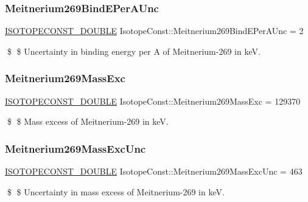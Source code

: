 \subsubsection{\texorpdfstring{Meitnerium269\+Bind\+E\+Per\+A\+Unc}{Meitnerium269BindEPerAUnc}}
{\footnotesize\ttfamily \mbox{\hyperlink{group___isotope_const-_macros_ga8f45a7272ce02c0b4c65c44636ed719a}{I\+S\+O\+T\+O\+P\+E\+C\+O\+N\+S\+T\+\_\+\+D\+O\+U\+B\+LE}} Isotope\+Const\+::\+Meitnerium269\+Bind\+E\+Per\+A\+Unc = 2}

\$ \$ Uncertainty in binding energy per A of Meitnerium-\/269 in keV. \mbox{\label{group___isotope_const-_meitnerium-_mt269_ga18ef91ebcac62baa5ece4bbbc952d447}} 
\subsubsection{\texorpdfstring{Meitnerium269\+Mass\+Exc}{Meitnerium269MassExc}}
{\footnotesize\ttfamily \mbox{\hyperlink{group___isotope_const-_macros_ga8f45a7272ce02c0b4c65c44636ed719a}{I\+S\+O\+T\+O\+P\+E\+C\+O\+N\+S\+T\+\_\+\+D\+O\+U\+B\+LE}} Isotope\+Const\+::\+Meitnerium269\+Mass\+Exc = 129370}

\$ \$ Mass excess of Meitnerium-\/269 in keV. \mbox{\label{group___isotope_const-_meitnerium-_mt269_ga03368d51ff0e5a684421efffaaed43e2}} 
\subsubsection{\texorpdfstring{Meitnerium269\+Mass\+Exc\+Unc}{Meitnerium269MassExcUnc}}
{\footnotesize\ttfamily \mbox{\hyperlink{group___isotope_const-_macros_ga8f45a7272ce02c0b4c65c44636ed719a}{I\+S\+O\+T\+O\+P\+E\+C\+O\+N\+S\+T\+\_\+\+D\+O\+U\+B\+LE}} Isotope\+Const\+::\+Meitnerium269\+Mass\+Exc\+Unc = 463}

\$ \$ Uncertainty in mass excess of Meitnerium-\/269 in keV. \mbox{\label{group___isotope_const-_meitnerium-_mt269_gaaaff493d477b27a1e3421ed872f187ac}} 
